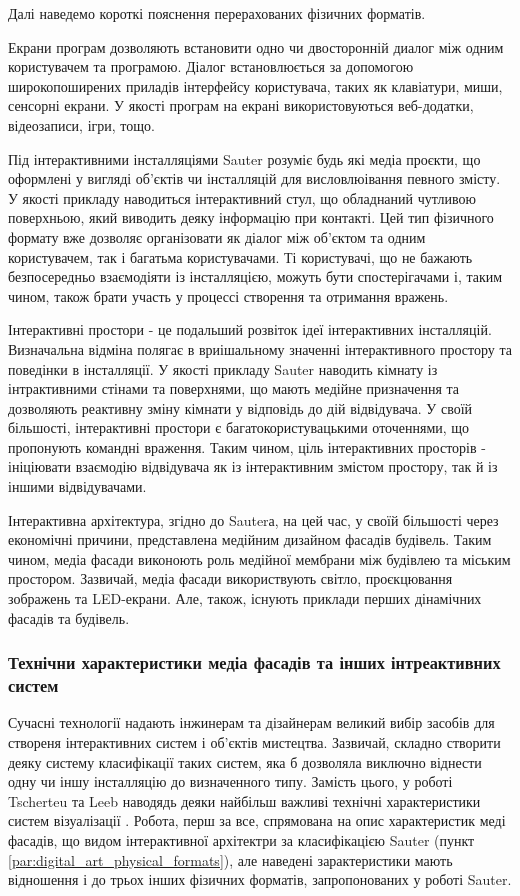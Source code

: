 \documentclass[a4paper,ukrainian,utf8,nocolumnsxix,floatsection,equationsection]{eskdtext}
\renewcommand\paragraph{\subsubsection}
\begin{document}
Далі наведемо короткі пояснення перерахованих фізичних форматів.

Екрани програм дозволяють встановити одно чи двосторонній диалог між одним користувачем та програмою. Діалог встановлюється за допомогою широкопоширених приладів інтерфейсу користувача, таких як клавіатури, миши, сенсорні екрани. У якості програм на екрані використовуються веб-додатки, відеозаписи, ігри, тощо.

Під інтерактивними інсталляціями Sauter розуміє будь які медіа проєкти, що оформлені у вигляді об’єктів чи інсталляцій для висловлюівання певного змісту. У якості прикладу наводиться інтерактивний стул, що обладнаний чутливою поверхньою, який виводить деяку інформацію при контакті. Цей тип фізичного формату вже дозволяє організовати як діалог між об’єктом та одним користувачем, так і багатьма користувачами. Ті користувачі, що не бажають безпосередньо взаємодіяти із інсталляцією, можуть бути спостерігачами і, таким чином, також брати участь у процессі створення та отримання вражень. 

Інтерактивні простори - це подальший розвіток ідеї інтерактивних інсталляцій. Визначальна відміна полягає в вриішальному значенні інтерактивного простору та поведінки в інсталляції. У якості прикладу Sauter наводить кімнату із інтрактивними стінами та поверхнями, що мають медійне призначення та дозволяють реактивну зміну кімнати у відповідь до дій відвідувача. У своїй більшості, інтерактивні простори є багатокористувацькими оточеннями, що пропонують командні враження. Таким чином, ціль інтерактивних просторів - ініціювати взаємодію відвідувача як із інтерактивним змістом простору, так й із іншими відвідувачами.

Інтерактивна архітектура, згідно до Sauterа, на цей час, у своїй більшості через економічні причини, представлена медійним дизайном фасадів будівель. Таким чином, медіа фасади виконоють роль медійної мембрани між будівлею та міським простором. Зазвичай, медіа фасади використвують світло, проєкцювання зображень та LED-екрани. Але, також, існують приклади перших дінамічних фасадів та будівель.

\paragraph{Технічни характеристики медіа фасадів та інших інтреактивних систем}

Сучасні технології надають інжинерам та дізайнерам великий вибір засобів для створеня інтерактивних систем і об’єктів мистецтва. Зазвичай, складно створити деяку систему класифікації таких систем, яка б дозволяла виключно віднести одну чи іншу інсталляцію до визначенного типу. Замість цього, у роботі \cite{media:facades:fundamentals} Tscherteu та Leeb наводядь деяки найбільш важливі технічні характеристики систем візуалізації . Робота, перш за все, спрямована на опис характеристик меді фасадів, що видом інтерактивної архітектри за класифікацією Sauter (пункт \ref{par:digital_art_physical_formats}), але наведені зарактеристики мають відношення і до трьох інших фізичних форматів, запропонованих у роботі Sauter.
\end{document}
